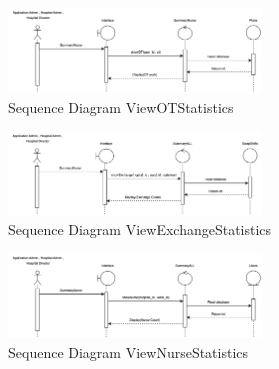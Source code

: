     \begin{figure}[h]
    \centering
    \includegraphics[width=0.6\textwidth]{Sequence 11.4.png}
    \caption{Sequence Diagram ViewOTStatistics}
    \end{figure}

    \begin{figure}[h]
    \centering
    \includegraphics[width=0.6\textwidth]{Sequence 11.5.png}
    \caption{Sequence Diagram ViewExchangeStatistics}
    \end{figure}

    \begin{figure}[h]
    \centering
    \includegraphics[width=0.6\textwidth]{Sequence 11.6.png}
    \caption{Sequence Diagram ViewNurseStatistics}
    \end{figure}

